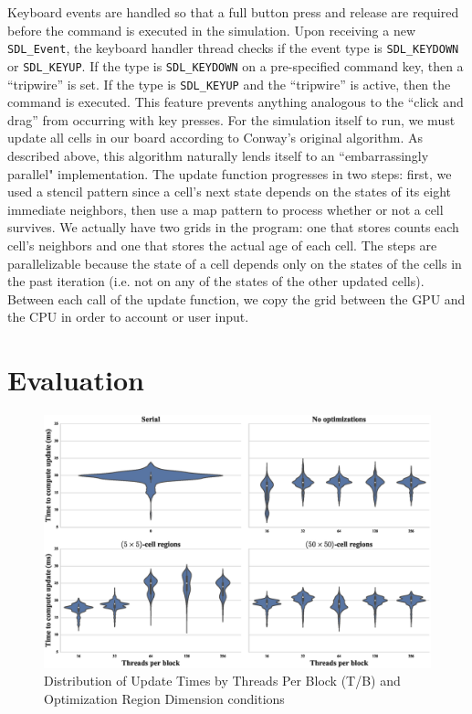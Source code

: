 \documentclass[onecolumn,12pt]{IEEEtran}
\begin{document}
  Keyboard events are handled so that a full button press and release are
  required before the command is executed in the simulation. Upon receiving a new
  \texttt{SDL\_Event}, the keyboard handler thread checks if the event type is
  \texttt{SDL\_KEYDOWN} or \texttt{SDL\_KEYUP}. If the type is
  \texttt{SDL\_KEYDOWN} on a pre-specified command key, then a ``tripwire'' is
  set. If the type is \texttt{SDL\_KEYUP} and the ``tripwire'' is active, then
  the command is executed. This feature prevents anything analogous to the
  ``click and drag'' from occurring with key presses.  For the simulation itself to run, we must update all cells in our board
  according to Conway's original algorithm. As described above, this algorithm
  naturally lends itself to an ``embarrassingly parallel" implementation. The
  update function progresses in two steps: first, we used a stencil pattern since
  a cell's next state depends on the states of its eight immediate neighbors,
  then use a map pattern to process whether or not a cell survives. We actually
  have two grids in the program: one that stores counts each cell's neighbors and
  one that stores the actual age of each cell. The steps are parallelizable
  because the state of a cell depends only on the states of the cells in the past
  iteration (i.e. not on any of the states of the other updated cells). Between
  each call of the update function, we copy the grid between the GPU and the CPU
  in order to account or user input.

  \section{Evaluation}

  \begin{figure}[t]
    \centering
      \includegraphics[width=\textwidth]{../images/boxplot.eps}
    \caption{Distribution of Update Times by Threads Per Block (T/B) and Optimization Region Dimension conditions}
    \label{fig:boxplots}
  \end{figure}
\end{document}

